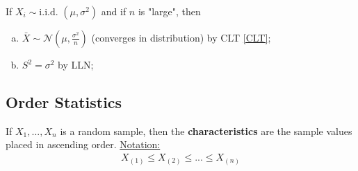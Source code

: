 \documentclass[11pt]{elegantbook}
\begin{document}
\begin{theorem}["Asymptotics"]
    If $X_i\sim \text{i.i.d. } (\mu,\sigma^2)$ and if $n$ is "large", then
    \begin{enumerate}[(a).]
        \item $\bar{X}\sim \mathcal{N}(\mu,\frac{\sigma^2}{n})$ (converges in distribution) by CLT \ref{CLT};
        \item $S^2=\sigma^2$ by LLN;
    \end{enumerate}
\end{theorem}

\subsection{Order Statistics}
\begin{definition}
    \normalfont
    If $X_1,...,X_n$ is a random sample, then the \textbf{characteristics} are the sample values placed in ascending order.
    \underline{Notation:}
    \begin{equation}
        \begin{aligned}
            X_{(1)}\leq X_{(2)}\leq ... \leq X_{(n)}
        \end{aligned}
        \nonumber
    \end{equation}
\end{definition}
\end{document}
